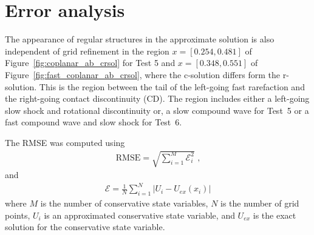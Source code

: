 

\section[Error analysis]{Error analysis}
\label{sec:error}

The appearance of regular structures in the approximate solution is also independent of grid refinement in the region $x=[0.254,0.481]$ of Figure~\ref{fig:coplanar_ab_crsol} for Test 5 and $x = [0.348,0.551]$ of Figure~\ref{fig:fast_coplanar_ab_crsol}, where the c-solution differs form the r-solution.  This is the region between the tail of the left-going fast rarefaction and the right-going contact discontinuity (CD).  The region includes either a left-going slow shock and rotational discontinuity or, a slow compound wave for Test~5 or a fast compound wave and slow shock for Test~6.  

The RMSE was computed using
\begin{gather*}
\text{RMSE} = \sqrt{\sum_{i=1}^M \mathcal{E}_i^2} \text{ ,}
\end{gather*}
and
\begin{gather*}
\mathcal{E} = \frac{1}{N}\sum_{i=1}^N \left|U_i - U_{ex}(x_i)\right|
\end{gather*} 
where $M$ is the number of conservative state variables, $N$ is the number of grid points, $U_i$ is an approximated conservative state variable, and $U_{ex}$ is the exact solution for the conservative state variable.  

